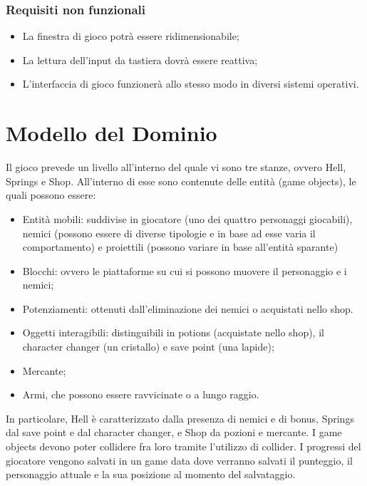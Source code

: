 \documentclass[a4paper,12pt]{report}
\begin{document}
\subsubsection{Requisiti non funzionali}
\begin{itemize}
    \item La finestra di gioco potrà essere ridimensionabile;
    \item La lettura dell’input da tastiera dovrà essere reattiva;
    \item L’interfaccia di gioco funzionerà allo stesso modo in diversi sistemi operativi.
\end{itemize}

\section{Modello del Dominio}

Il gioco prevede un livello all’interno del quale vi sono tre stanze, ovvero Hell, Springs e Shop.
All’interno di esse sono contenute delle entità (game objects), le quali possono essere:

\begin{itemize}
    \item Entità mobili: suddivise in giocatore (uno dei quattro personaggi giocabili), nemici (possono essere di diverse tipologie e in base ad esse varia il comportamento) e proiettili (possono variare in base all’entità sparante)
    \item Blocchi: ovvero le piattaforme su cui si possono muovere il personaggio e i nemici;
    \item Potenziamenti: ottenuti dall’eliminazione dei nemici o acquistati nello shop.
    \item Oggetti interagibili: distinguibili in potions (acquistate nello shop), il character changer (un cristallo) e save point (una lapide);
    \item Mercante;
    \item Armi, che possono essere ravvicinate o a lungo raggio.
\end{itemize}

In particolare, Hell è caratterizzato dalla presenza di nemici e di bonus, Springs dal save point e dal character changer, e Shop da pozioni e mercante.
I game objects devono poter collidere fra loro tramite l’utilizzo di collider.
I progressi del giocatore vengono salvati in un game data dove verranno salvati il punteggio, il personaggio attuale e la sua posizione al momento del salvataggio.
\end{document}
